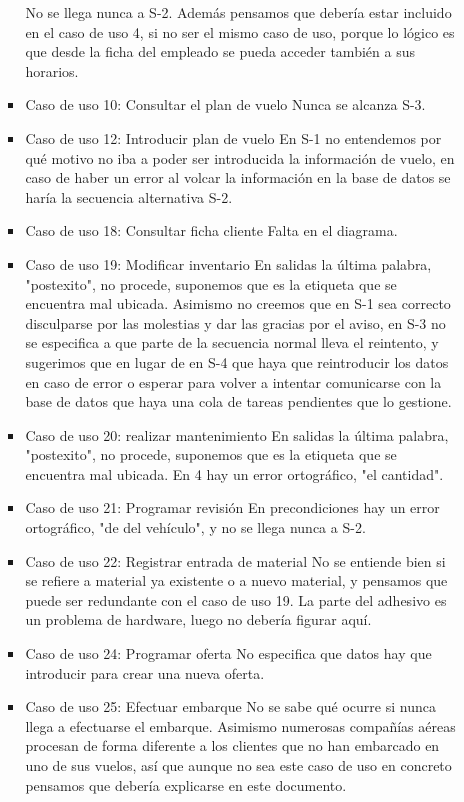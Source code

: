 \documentclass[11pt, a4paper, twoside, titlepage]{article}
\begin{document}
\begin{itemize}
\begin{itemize}
\begin{itemize}
								No se llega nunca a S-2. Además pensamos que debería estar incluido en el caso de uso 4, si no ser el mismo caso de uso, porque lo lógico es que desde la ficha del empleado se pueda acceder también a sus horarios.
							\item Caso de uso 10: Consultar el plan de vuelo 
								Nunca se alcanza S-3.
							\item Caso de uso 12: Introducir plan de vuelo 
								En S-1 no entendemos por qué motivo no iba a poder ser introducida la información de vuelo, en caso de haber un error al volcar la información en la base de datos se haría la secuencia alternativa S-2.
							\item Caso de uso 18: Consultar ficha cliente 
								Falta en el diagrama.
							\item Caso de uso 19: Modificar inventario 
								En salidas la última palabra, "postexito", no procede, suponemos que es la etiqueta que se encuentra mal ubicada. Asimismo no creemos que en S-1 sea correcto disculparse por las molestias y dar las gracias por el aviso, en 	S-3 no se especifica a que parte de la secuencia normal lleva el reintento, y sugerimos que en lugar de en S-4 que haya que reintroducir los datos en caso de error o esperar para volver a intentar comunicarse con la base de datos que haya una cola de tareas pendientes que lo gestione.
							\item Caso de uso 20: realizar mantenimiento 
								En salidas la última palabra, "postexito", no procede, suponemos que es la etiqueta que se encuentra mal ubicada. En 4 hay un error ortográfico, "el cantidad".
							\item Caso de uso 21: Programar revisión 
								En precondiciones hay un error ortográfico, "de del vehículo", y no se llega nunca a S-2.
							\item Caso de uso 22: Registrar entrada de material 
								No se entiende bien si se refiere a material ya existente o a nuevo material, y pensamos que puede ser redundante con el caso de uso 19. La parte del adhesivo es un problema de hardware, luego no debería figurar aquí.
							\item Caso de uso 24: Programar oferta 
								No especifica que datos hay que introducir para crear una nueva oferta.
							\item Caso de uso 25: Efectuar embarque 
								No se sabe qué ocurre si nunca llega a efectuarse el embarque. Asimismo numerosas compañías aéreas procesan de forma diferente a los clientes que no han embarcado en uno de sus vuelos, así que aunque no sea este caso de uso en concreto pensamos que debería explicarse en este documento.

\end{itemize}
\end{itemize}
\end{itemize}
\end{document}
